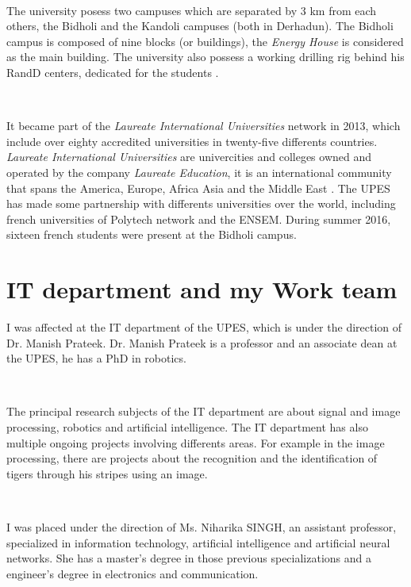 ~~

The university posess two campuses which are separated by 3 km from each others, the Bidholi and the Kandoli campuses (both in Derhadun). The Bidholi campus is composed of nine blocks (or buildings), the \emph{Energy House} is considered as the main building. The university also possess a working drilling rig behind his \gls{RandD} centers, dedicated for the students \cite{bib:upes:wikipedia}.

~~ 

It became part of the \emph{Laureate International Universities} network in 2013, which include over eighty accredited universities in twenty-five differents countries. \emph{Laureate International Universities} are univercities and colleges owned and operated by the company \emph{Laureate Education}, it is an international community that spans the America, Europe, Africa Asia and the Middle East \cite{bib:laureate:site}. The \gls{UPES} has made some partnership with differents universities over the world, including french universities of  Polytech network and the \gls{ENSEM}. During summer 2016, sixteen french students were present at the Bidholi campus. 


\section{IT department and my Work team}

I was affected at the \gls{IT} department of the \gls{UPES}, which is under the direction of Dr. Manish Prateek. Dr. Manish Prateek is a professor and an associate dean at the \gls{UPES}, he has a PhD in robotics. 

~~

The principal research subjects of the \gls{IT} department are about signal and \gls{image processing}, robotics and artificial intelligence. The \gls{IT} department has also multiple ongoing projects involving differents areas. For example in the \gls{image processing}, there are projects about the recognition and the identification of tigers through his stripes using an image. 

~~

I was placed under the direction of Ms. Niharika SINGH, an assistant professor, specialized in information technology, artificial intelligence and artificial neural networks. She has a master's degree in those previous specializations and a engineer's degree in electronics and communication.

~~

